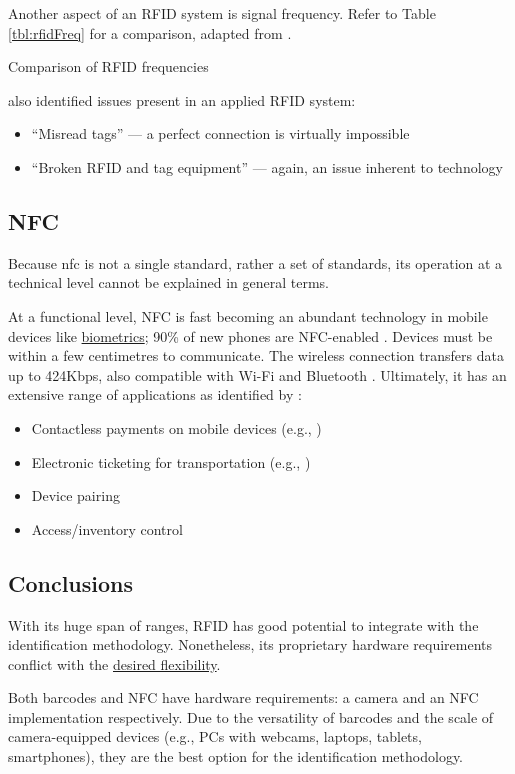 Another aspect of an RFID system is signal frequency.
Refer to Table \ref{tbl:rfidFreq} for a comparison, adapted
from \cite{whatIsRfid}.

\begin{table}[ht]
  \centering
  
  \caption{Comparison of RFID frequencies}
  \label{tbl:rfidFreq}
\end{table}

\cite{barcodeRfidComparison} also identified issues present
in an applied RFID system:

\begin{itemize}

  \item \enquote{Misread tags} --- a perfect
        connection is virtually impossible

  \item \enquote{Broken RFID and tag equipment}
        --- again, an issue inherent to technology

\end{itemize}

\subsection{NFC} \label{ss:nfc}

Because \gls{nfc} is not a single standard, rather a set of
standards, its operation at a technical level cannot be
explained in general terms.


At a functional level, NFC is fast becoming an abundant
technology in mobile devices like
\hyperref[ss:biometrics]{biometrics}; 90\% of new phones
are NFC-enabled \parencite{nfcHandsetStats}. Devices must be
within a few centimetres to communicate. The wireless
connection transfers data up to 424Kbps, also compatible 
with Wi-Fi and Bluetooth \parencite{nfc}. Ultimately, it has
an extensive range of applications as identified by 
\cite{nfc}: 

\begin{itemize}
  \item Contactless payments on mobile devices
        (e.g., \cite{androidPayWithPhone, applePay})
  \item Electronic ticketing for transportation
        (e.g., \cite{digitalTickets})
  \item Device pairing
  \item Access/inventory control
\end{itemize}

\subsection{Conclusions}

With its huge span of ranges, RFID has good potential to
integrate with the identification methodology. Nonetheless,
its proprietary hardware requirements conflict with the 
\hyperref[ss:goal]{desired flexibility}. 

Both barcodes and NFC have hardware requirements: a camera
and an NFC implementation respectively. Due to the
versatility of barcodes and the scale of camera-equipped
devices (e.g., PCs with webcams, laptops, tablets,
smartphones), they are the best option for the 
identification methodology.